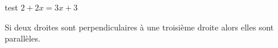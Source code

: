 \documentclass[a4paper,12pt]{report}
\begin{document}
test
$2+2x=3x+3$
\begin{propriete}
Si deux droites sont perpendiculaires à une troisième droite alors elles sont parallèles.
\end{propriete}
\end{document}
